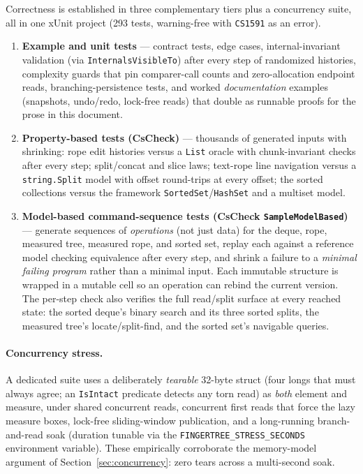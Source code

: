 \documentclass[11pt]{article}
\newcommand{\cs}[1]{\lstinline|#1|}
\begin{document}
Correctness is established in three complementary tiers plus a concurrency suite, all in one xUnit project
(293 tests, warning-free with \cs{CS1591} as an error).

\begin{enumerate}[leftmargin=1.6em, itemsep=2pt]
  \item \textbf{Example and unit tests} --- contract tests, edge cases, internal-invariant validation
    (via \cs{InternalsVisibleTo}) after every step of randomized histories, complexity guards that pin
    comparer-call counts and zero-allocation endpoint reads, branching-persistence tests, and worked
    \emph{documentation} examples (snapshots, undo/redo, lock-free reads) that double as runnable proofs
    for the prose in this document.
  \item \textbf{Property-based tests (CsCheck)} --- thousands of generated inputs with shrinking: rope
    edit histories versus a \cs{List} oracle with chunk-invariant checks after every step; split/concat
    and slice laws; text-rope line navigation versus a \cs{string.Split} model with offset round-trips at
    every offset; the sorted collections versus the framework \cs{SortedSet}/\cs{HashSet} and a multiset
    model.
  \item \textbf{Model-based command-sequence tests (CsCheck \cs{SampleModelBased})} --- generate
    sequences of \emph{operations} (not just data) for the deque, rope, measured tree, measured rope, and
    sorted set, replay each against a reference model checking equivalence after every step, and shrink a
    failure to a \emph{minimal failing program} rather than a minimal input. Each immutable structure is
    wrapped in a mutable cell so an operation can rebind the current version. The per-step check also
    verifies the full read/split surface at every reached state: the sorted deque's binary search and its
    three sorted splits, the measured tree's locate/split-find, and the sorted set's navigable queries.
\end{enumerate}

\paragraph{Concurrency stress.} A dedicated suite uses a deliberately \emph{tearable} 32-byte struct
(four longs that must always agree; an \cs{IsIntact} predicate detects any torn read) as \emph{both}
element and measure, under shared concurrent reads, concurrent first reads that force the lazy measure
boxes, lock-free sliding-window publication, and a long-running branch-and-read soak (duration tunable via
the \cs{FINGERTREE_STRESS_SECONDS} environment variable). These empirically corroborate the memory-model
argument of Section~\ref{sec:concurrency}: zero tears across a multi-second soak.
\end{document}

